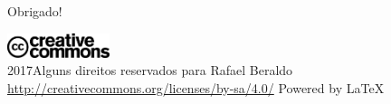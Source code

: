 \begin{frame}[standout]
  \Huge
  Obrigado!
\end{frame}

\begin{frame}
  \begin{center}
    \vspace{2em}
    \includegraphics[width=3cm]{imagens/cc}\\
    2017\qquad Alguns direitos reservados para Rafael Beraldo
    \vspace{1em}
    \url{http://creativecommons.org/licenses/by-sa/4.0/}
    \vfill
    \huge{Powered by \LaTeX{}}
  \end{center}
\end{frame}

